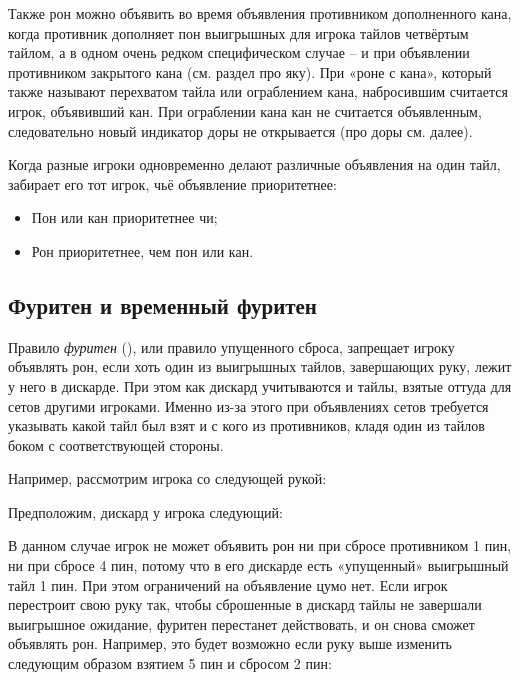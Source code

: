 Также рон можно объявить во время объявления противником дополненного кана, когда противник дополняет пон выигрышных для игрока тайлов четвёртым тайлом, а в одном очень редком специфическом случае – и при объявлении противником закрытого кана (см. раздел про яку). При «роне с кана», который также называют перехватом тайла или ограблением кана, набросившим считается игрок, объявивший кан. При ограблении кана кан не считается объявленным, следовательно новый индикатор доры не открывается (про доры см. далее).

Когда разные игроки одновременно делают различные объявления на один тайл, забирает его тот игрок, чьё объявление приоритетнее:

\begin{itemize}
	\item Пон или кан приоритетнее чи;
	\item Рон приоритетнее, чем пон или кан.
\end{itemize}

\subsection{Фуритен и временный фуритен}

Правило \textit{фуритен} (), или правило упущенного сброса, запрещает игроку объявлять рон, если хоть один из выигрышных тайлов, завершающих руку, лежит у него в дискарде. При этом как дискард учитываются и тайлы, взятые оттуда для сетов другими игроками. Именно из-за этого при объявлениях сетов требуется указывать какой тайл был взят и с кого из противников, кладя один из тайлов боком с соответствующей стороны.

Например, рассмотрим игрока со следующей рукой:


Предположим, дискард у игрока следующий:


В данном случае игрок не может объявить рон ни при сбросе противником 1 пин, ни при сбросе 4 пин, потому что в его дискарде есть «упущенный» выигрышный тайл 1 пин. При этом ограничений на объявление цумо нет. Если игрок перестроит свою руку так, чтобы сброшенные в дискард тайлы не завершали выигрышное ожидание, фуритен перестанет действовать, и он снова сможет объявлять рон. Например, это будет возможно если руку выше изменить следующим образом взятием 5 пин и сбросом 2 пин: 


